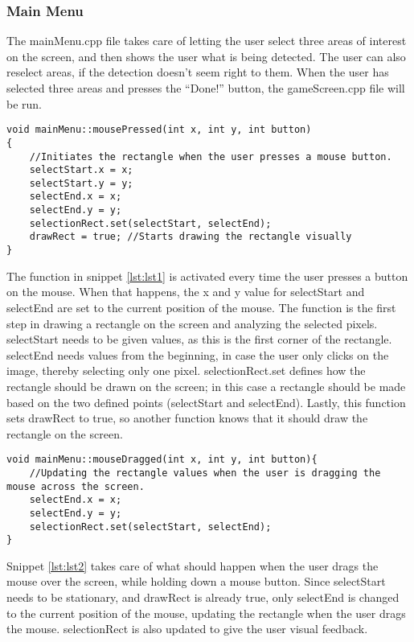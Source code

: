 \subsubsection*{Main Menu}
The mainMenu.cpp file takes care of letting the user select three areas of interest on the screen, and then shows the user what is being detected. 
The user can also reselect areas, if the detection doesn’t seem right to them. 
When the user has selected three areas and presses the “Done!” button, the gameScreen.cpp file will be run.
\bigskip

\pagebreak[4]
\begin{lstlisting}[caption=mousePressed function, label=lst:lst1]
void mainMenu::mousePressed(int x, int y, int button)
{
    //Initiates the rectangle when the user presses a mouse button.
    selectStart.x = x;
    selectStart.y = y;
    selectEnd.x = x;
    selectEnd.y = y;
    selectionRect.set(selectStart, selectEnd);
    drawRect = true; //Starts drawing the rectangle visually
}

\end{lstlisting}

The function in snippet \ref{lst:lst1} is activated every time the user presses a button on the mouse. 
When that happens, the x and y value for selectStart and selectEnd are set to the current position of the mouse. 
The function is the first step in drawing a rectangle on the screen and analyzing the selected pixels. 
selectStart needs to be given values, as this is the first corner of the rectangle. 
selectEnd needs values from the beginning, in case the user only clicks on the image, thereby selecting only one pixel.
selectionRect.set defines how the rectangle should be drawn on the screen; in this case a rectangle should be made based on the two defined points (selectStart and selectEnd).
Lastly, this function sets drawRect to true, so another function knows that it should draw the rectangle on the screen.
\bigskip

\begin{lstlisting}[caption=mouseDragged function, label=lst:lst2]
void mainMenu::mouseDragged(int x, int y, int button){
    //Updating the rectangle values when the user is dragging the mouse across the screen.
    selectEnd.x = x;
    selectEnd.y = y;
    selectionRect.set(selectStart, selectEnd);
}

\end{lstlisting}

Snippet \ref{lst:lst2} takes care of what should happen when the user drags the mouse over the screen, while holding down a mouse button. 
Since selectStart needs to be stationary, and drawRect is already true, only selectEnd is changed to the current position of the mouse, updating the rectangle when the user drags the mouse. 
selectionRect is also updated to give the user visual feedback.
\bigskip

